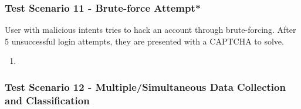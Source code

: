 \subsubsection{Test Scenario 11 - Brute-force Attempt*}
User with malicious intents tries to hack an account through brute-forcing. After 5 unsuccessful login attempts, they are presented with a CAPTCHA to solve.
\begin{enumerate}
    \item 
\end{enumerate}
\subsubsection{Test Scenario 12 - Multiple/Simultaneous Data Collection and Classification}
